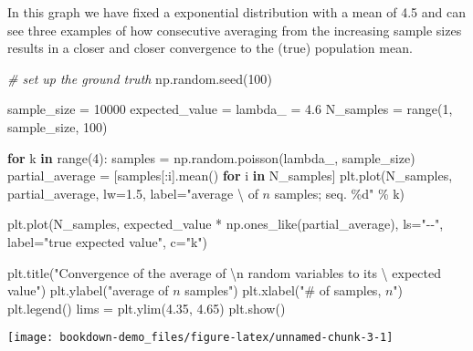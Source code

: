 \documentclass[]{tufte-book}
\newenvironment{Shaded}{}{}
\newcommand{\BuiltInTok}[1]{#1}
\newcommand{\CharTok}[1]{\textcolor[rgb]{0.25,0.44,0.63}{#1}}
\newcommand{\CommentTok}[1]{\textcolor[rgb]{0.38,0.63,0.69}{\textit{#1}}}
\newcommand{\ControlFlowTok}[1]{\textcolor[rgb]{0.00,0.44,0.13}{\textbf{#1}}}
\newcommand{\DecValTok}[1]{\textcolor[rgb]{0.25,0.63,0.44}{#1}}
\newcommand{\FloatTok}[1]{\textcolor[rgb]{0.25,0.63,0.44}{#1}}
\newcommand{\KeywordTok}[1]{\textcolor[rgb]{0.00,0.44,0.13}{\textbf{#1}}}
\newcommand{\NormalTok}[1]{#1}
\newcommand{\OperatorTok}[1]{\textcolor[rgb]{0.40,0.40,0.40}{#1}}
\newcommand{\SpecialCharTok}[1]{\textcolor[rgb]{0.25,0.44,0.63}{#1}}
\newcommand{\StringTok}[1]{\textcolor[rgb]{0.25,0.44,0.63}{#1}}
\theoremstyle{definition}
\theoremstyle{definition}
\theoremstyle{definition}
\theoremstyle{remark}
\begin{document}
In this graph we have fixed a exponential distribution with a mean of 4.5 and can see three examples of how consecutive averaging from the increasing sample sizes results in a closer and closer convergence to the (true) population mean.

\begin{Shaded}
\begin{Highlighting}[]
\CommentTok{\# set up the ground truth}
\NormalTok{np.random.seed(}\DecValTok{100}\NormalTok{)}

\NormalTok{sample\_size }\OperatorTok{=} \DecValTok{10000}
\NormalTok{expected\_value }\OperatorTok{=}\NormalTok{ lambda\_ }\OperatorTok{=} \FloatTok{4.6}
\NormalTok{N\_samples }\OperatorTok{=} \BuiltInTok{range}\NormalTok{(}\DecValTok{1}\NormalTok{, sample\_size, }\DecValTok{100}\NormalTok{)}

\ControlFlowTok{for}\NormalTok{ k }\KeywordTok{in} \BuiltInTok{range}\NormalTok{(}\DecValTok{4}\NormalTok{):}
\NormalTok{    samples }\OperatorTok{=}\NormalTok{ np.random.poisson(lambda\_, sample\_size)}
\NormalTok{    partial\_average }\OperatorTok{=}\NormalTok{ [samples[:i].mean() }\ControlFlowTok{for}\NormalTok{ i }\KeywordTok{in}\NormalTok{ N\_samples]}
\NormalTok{    plt.plot(N\_samples, partial\_average, lw}\OperatorTok{=}\FloatTok{1.5}\NormalTok{, label}\OperatorTok{=}\StringTok{"average \textbackslash{}}
\StringTok{    of  $n$ samples; seq. }\SpecialCharTok{\%d}\StringTok{"} \OperatorTok{\%}\NormalTok{ k)}

\NormalTok{plt.plot(N\_samples, expected\_value }\OperatorTok{*}\NormalTok{ np.ones\_like(partial\_average),}
\NormalTok{         ls}\OperatorTok{=}\StringTok{"{-}{-}"}\NormalTok{, label}\OperatorTok{=}\StringTok{"true expected value"}\NormalTok{, c}\OperatorTok{=}\StringTok{"k"}\NormalTok{)}

\NormalTok{plt.title(}\StringTok{"Convergence of the average of }\CharTok{\textbackslash{}n}\StringTok{ random variables to its \textbackslash{}}
\StringTok{expected value"}\NormalTok{)}
\NormalTok{plt.ylabel(}\StringTok{"average of $n$ samples"}\NormalTok{)}
\NormalTok{plt.xlabel(}\StringTok{"\# of samples, $n$"}\NormalTok{)}
\NormalTok{plt.legend()}
\NormalTok{lims }\OperatorTok{=}\NormalTok{ plt.ylim(}\FloatTok{4.35}\NormalTok{, }\FloatTok{4.65}\NormalTok{)}
\NormalTok{plt.show()}
\end{Highlighting}
\end{Shaded}

\texttt{[image: bookdown-demo\_files/figure-latex/unnamed-chunk-3-1]}
\end{document}

